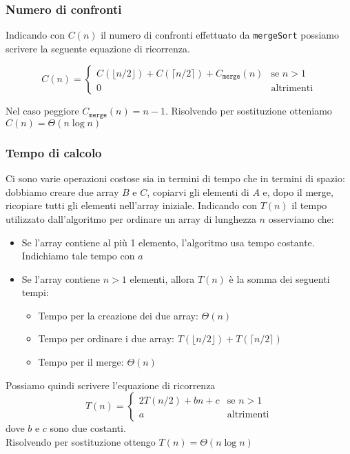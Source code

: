 \subsubsection*{Numero di confronti}
Indicando con $C(n)$ il numero di confronti effettuato da {\texttt{mergeSort}}
possiamo scrivere la seguente equazione di ricorrenza.

\begin{equation*}
    C(n)=\begin{cases}
        C(\lfloor n/2 \rfloor) + C(\lceil n/2 \rceil) + C_{\texttt{merge}}(n) & \text{se $n > 1$}\\
        0 & \text{altrimenti}
    \end{cases}
\end{equation*}

Nel caso peggiore $C_{\texttt{merge}}(n) = n - 1$. Risolvendo per sostituzione
otteniamo $C(n) = \Theta(n \log n)$

\subsubsection*{Tempo di calcolo}
Ci sono varie operazioni costose sia in termini di tempo che in termini di spazio:
dobbiamo creare due array $B$ e $C$, copiarvi gli elementi di $A$ e, dopo il 
merge, ricopiare tutti gli elementi nell'array iniziale. Indicando con $T(n)$ il tempo
utilizzato dall'algoritmo per ordinare un array di lunghezza $n$ osserviamo che:
\begin{itemize}
    \item Se l'array contiene al più 1 elemento, l'algoritmo usa tempo costante.
    Indichiamo tale tempo con $a$
    \item Se l'array contiene $n > 1$ elementi, allora $T(n)$ è la somma dei seguenti tempi:
    \begin{itemize}
        \item Tempo per la creazione dei due array: $\Theta(n)$
        \item Tempo per ordinare i due array: $T(\lfloor n/2 \rfloor) + T(\lceil n/2 \rceil)$
        \item Tempo per il merge: $\Theta(n)$
    \end{itemize}

\end{itemize}
\noindent Possiamo quindi scrivere l'equazione di ricorrenza
\begin{equation*}
    T(n)=\begin{cases}
        2T(n/2) + bn + c & \text{se $n > 1$}\\
        a & \text{altrimenti}
    \end{cases}
\end{equation*}
dove $b$ e $c$ sono due costanti.\\
Risolvendo per sostituzione ottengo $T(n) = \Theta(n \log n)$

